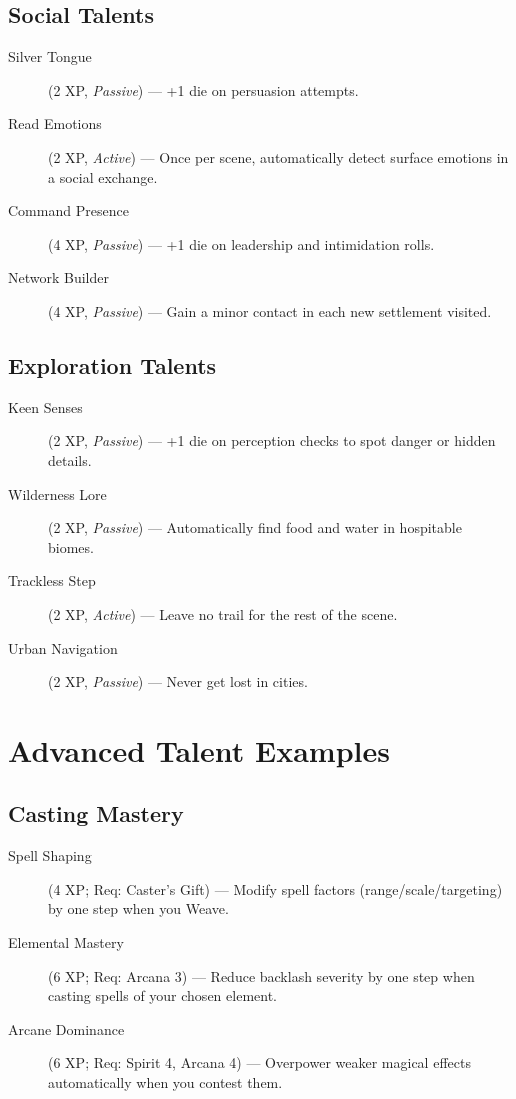 \subsection*{Social Talents}
\begin{description}
\item[Silver Tongue] (2 XP, \emph{Passive}) --- +1 die on persuasion attempts.
\item[Read Emotions] (2 XP, \emph{Active}) --- Once per scene, automatically detect surface emotions in a social exchange.
\item[Command Presence] (4 XP, \emph{Passive}) --- +1 die on leadership and intimidation rolls.
\item[Network Builder] (4 XP, \emph{Passive}) --- Gain a minor contact in each new settlement visited.
\end{description}

\subsection*{Exploration Talents}
\begin{description}
\item[Keen Senses] (2 XP, \emph{Passive}) --- +1 die on perception checks to spot danger or hidden details.
\item[Wilderness Lore] (2 XP, \emph{Passive}) --- Automatically find food and water in hospitable biomes.
\item[Trackless Step] (2 XP, \emph{Active}) --- Leave no trail for the rest of the scene.
\item[Urban Navigation] (2 XP, \emph{Passive}) --- Never get lost in cities.
\end{description}

\section{Advanced Talent Examples}

\subsection*{Casting Mastery}
\begin{description}
\item[Spell Shaping] (4 XP; Req: Caster's Gift) --- Modify spell factors (range/scale/targeting) by one step when you Weave.
\item[Elemental Mastery] (6 XP; Req: Arcana 3) --- Reduce backlash severity by one step when casting spells of your chosen element.
\item[Arcane Dominance] (6 XP; Req: Spirit 4, Arcana 4) --- Overpower weaker magical effects automatically when you contest them.
\end{description}

